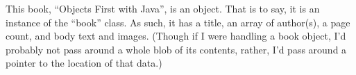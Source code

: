 This book, ``Objects First with Java'', is an object. That is to say, it
is an instance of the ``book'' class. As such, it has a title, an array
of author(s), a page count, and body text and images. (Though if I were
handling a book object, I'd probably not pass around a whole blob of its
contents, rather, I'd pass around a pointer to the location of that
data.)
